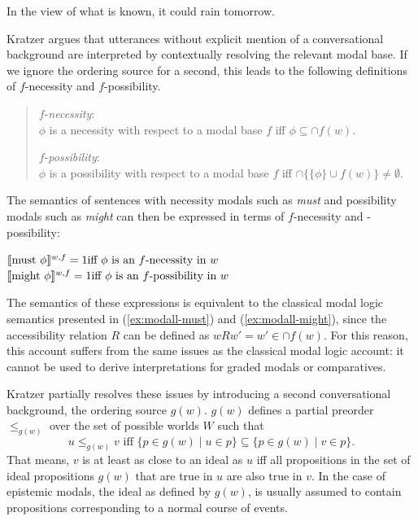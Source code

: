 \begin{exe}
\ex In the view of what is known, it could rain tomorrow.
\end{exe}

\noindent Kratzer argues that utterances without explicit mention of a conversational background are interpreted
by contextually resolving the relevant modal base. If we ignore the ordering source for a second, this leads to the following 
definitions of $f$-necessity and $f$-possibility.

\begin{quote}
\noindent $f$-\textit{necessity}: \\
$\phi$ is a necessity with respect to a modal base $f$ iff $\phi \subseteq \cap f(w)$.

\noindent $f$-\textit{possibility}: \\
$\phi$ is a possibility with respect to a modal base $f$ iff $\cap \{\{\phi\} \cup  f(w) \} \ne \emptyset$.
\end{quote}

The semantics of sentences with necessity modals such as \textit{must} and possibility modals such as \textit{might}
can then be expressed in terms of $f$-necessity and -possibility:

\begin{exe}
\ex $\llbracket\mbox{must }\phi\rrbracket^{w,f} = 1 \mbox{iff $\phi$ is an $f$-necessity in $w$} $
\ex $\llbracket\mbox{might } \phi\rrbracket^{w,f} = 1 \mbox{iff $\phi$ is an $f$-possibility in $w$} $
\end{exe}

The semantics of these expressions is equivalent to the classical modal logic semantics presented in (\ref{ex:modall-must})  and (\ref{ex:modall-might}), 
since the accessibility relation $R$ can be defined as $wRw' = w' \in \cap f(w)$. For this reason, this account suffers from the same
issues as the classical modal logic account: it cannot be used to derive interpretations for graded modals or comparatives.

Kratzer partially resolves these issues by introducing a second conversational background, 
the ordering source $g(w)$. $g(w)$ defines a partial preorder $\le_{g(w)}$ over the set of possible worlds $W$ such that 
$$u \le_{g(w)} v \mbox{ iff } \{ p \in g(w) \mid u \in p \} \subseteq \{ p \in g(w) \mid v \in p \}.$$
That means, $v$ is at least as close to an ideal as $u$ iff all propositions in the set of ideal 
propositions $g(w)$ that are true in $u$ are also true in $v$. In the case of epistemic modals, 
the ideal as defined by $g(w)$, is usually assumed to contain propositions corresponding to a normal course of events.

